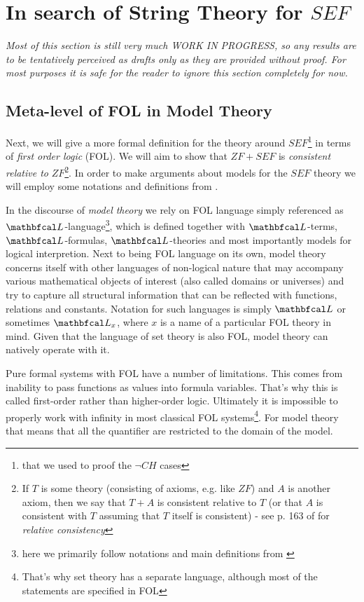 \pagebreak
\section{In search of String Theory for $SEF$}\label{sec_st_sef}

\textit{Most of this section is still very much WORK IN PROGRESS, so any results are to be tentatively perceived as drafts only as they are provided without proof. For most purposes it is safe for the reader to ignore this section completely for now.}

\subsection{Meta-level of FOL in Model Theory}

Next, we will give a more formal definition for the theory around $SEF$\footnote{that we used to proof the $\neg CH$ cases} in terms of \textit{first order logic} (FOL). We will aim to show that $ZF+SEF$ is \textit{consistent relative to} $ZF$\footnote{If $T$ is some theory (consisting of axioms, e.g. like $ZF$) and $A$ is another axiom, then we say that $T + A$ is consistent relative to $T$ (or that $A$ is consistent with $T$ assuming that $T$ itself is consistent) - see p. 163 of \cite{jech2003set} for \textit{relative consistency}}. In order to make arguments about models for the $SEF$ theory we will employ some notations and definitions from \cite{marker2002model}.

In the discourse of \textit{model theory} we rely on FOL language simply referenced as $\lsign$-language\footnote{here we primarily follow notations and main definitions from \cite{marker2002model}}, which is defined together with $\lsign$-terms, $\lsign$-formulas, $\lsign$-theories and most importantly models for logical interpretion. Next to being FOL language on its own, model theory concerns itself with other languages of non-logical nature that may accompany various mathematical objects of interest (also called domains or universes) and try to capture all structural information that can be reflected with functions, relations and constants. Notation for such languages is simply $\lsign$ or sometimes  $\lsign_{x}$, where $x$ is a name of a particular FOL theory in mind. Given that the language of set theory is also FOL, model theory can natively operate with it. 

Pure formal systems with FOL have a number of limitations. This comes from inability to pass functions as values into formula variables. That's why this is called first-order rather than higher-order logic. Ultimately it is impossible to properly work with infinity in most classical FOL systems\footnote{That's why set theory has a separate language, although most of the statements are specified in FOL}. For model theory that means that all the quantifier are restricted to the domain of the model.

